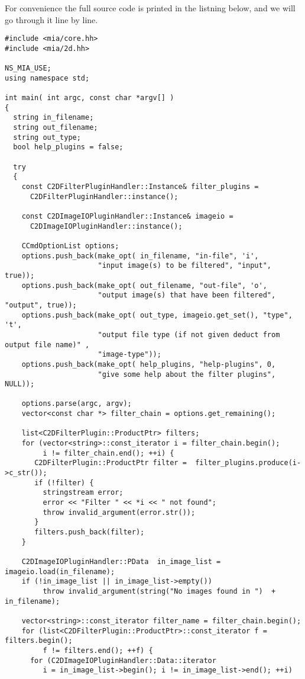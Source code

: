 For convenience the full source code is printed in the listning below, and we will go through it line by line. 
\lstset{language=c++}
\begin{lstlisting}
#include <mia/core.hh>
#include <mia/2d.hh>

NS_MIA_USE; 
using namespace std; 

int main( int argc, const char *argv[] )
{
  string in_filename;
  string out_filename;
  string out_type; 
  bool help_plugins = false; 

  try 
  {
    const C2DFilterPluginHandler::Instance& filter_plugins = 
      C2DFilterPluginHandler::instance();
  
    const C2DImageIOPluginHandler::Instance& imageio = 
      C2DImageIOPluginHandler::instance();
  
    CCmdOptionList options;  
    options.push_back(make_opt( in_filename, "in-file", 'i', 
                      "input image(s) to be filtered", "input", true)); 
    options.push_back(make_opt( out_filename, "out-file", 'o', 
                      "output image(s) that have been filtered", "output", true)); 
    options.push_back(make_opt( out_type, imageio.get_set(), "type", 't',
                      "output file type (if not given deduct from output file name)" , 
                      "image-type"));
    options.push_back(make_opt( help_plugins, "help-plugins", 0, 
                      "give some help about the filter plugins", NULL)); 

    options.parse(argc, argv); 
    vector<const char *> filter_chain = options.get_remaining(); 

    list<C2DFilterPlugin::ProductPtr> filters;
    for (vector<string>::const_iterator i = filter_chain.begin(); 
         i != filter_chain.end(); ++i) {
       C2DFilterPlugin::ProductPtr filter =  filter_plugins.produce(i->c_str()); 
       if (!filter) {
         stringstream error; 
         error << "Filter " << *i << " not found"; 
         throw invalid_argument(error.str());
       }
       filters.push_back(filter);
    }

    C2DImageIOPluginHandler::PData  in_image_list = imageio.load(in_filename);  
    if (!in_image_list || in_image_list->empty())
         throw invalid_argument(string("No images found in ")  + in_filename);

    vector<string>::const_iterator filter_name = filter_chain.begin();
    for (list<C2DFilterPlugin::ProductPtr>::const_iterator f = filters.begin(); 
         f != filters.end(); ++f) {
      for (C2DImageIOPluginHandler::Data::iterator   
         i = in_image_list->begin(); i != in_image_list->end(); ++i)
    

\end{lstlisting}
